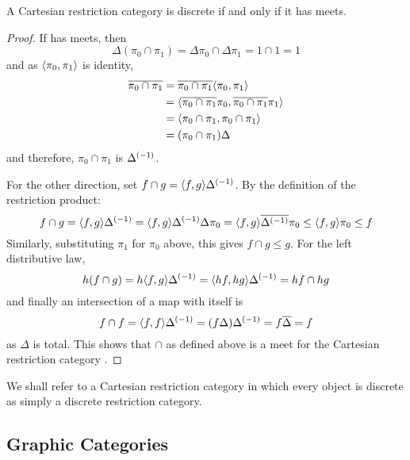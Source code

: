 \begin{theorem}\label{thm:a_crc_is_discrete_iff_it_has_meets}
A Cartesian restriction category \X is discrete if and only if it has meets.
\end{theorem}
\begin{proof}
If \X has meets, then
\[
\Delta(\pi_0 \cap \pi_1) = \Delta\pi_0 \cap \Delta\pi_1 = 1\cap 1 = 1
\]
and as $\langle\pi_0,\pi_1\rangle$ is identity,
\begin{align*}
\overline{\pi_0 \cap \pi_1} &= \overline{\pi_0 \cap \pi_1} \langle\pi_0, \pi_1\rangle \\
&=\langle\overline{\pi_0 \cap \pi_1}\pi_0, \overline{\pi_0 \cap \pi_1}\pi_1\rangle\\
&=\langle\pi_0 \cap \pi_1,\pi_0 \cap \pi_1\rangle\\
&=(\pi_0 \cap \pi_1 )\Delta
\end{align*}
and therefore, $\pi_0 \cap \pi_1$ is ${\Delta}^{(-1)}$.

For the other direction, set $f\cap g = \langle f,g\rangle{\Delta}^{(-1)}$.
By the definition of the restriction product:
\[
f \cap g =  \langle f,g\rangle{\Delta}^{(-1)} =\langle f,g\rangle{\Delta}^{(-1)} \Delta \pi_0 =
\langle f,g\rangle\overline{{\Delta}^{(-1)}}\pi_0 \le \langle f,g\rangle\pi_0 \le f
\]
Similarly, substituting $\pi_1$ for $\pi_0$ above, this gives
 $f \cap g \le g$.
For the left distributive law,
\[
h(f \cap g) = h \langle f,g\rangle{\Delta}^{(-1)} =  \langle h f,h g\rangle{\Delta}^{(-1)} = h f \cap h g
\]
and finally an intersection of a map with itself is
\[f\cap f = \langle f,f\rangle {\Delta}^{(-1)} = (f \Delta) {\Delta}^{(-1)} = f \overline{\Delta} = f \]
as $\Delta$ is total. This shows that $\cap$ as defined above is a meet for the
Cartesian restriction category \X.

\end{proof}

We shall refer to a Cartesian restriction category in which every object is
discrete as simply a discrete restriction category.

\subsection{Graphic Categories} %
\label{sub:graphic_categories}


